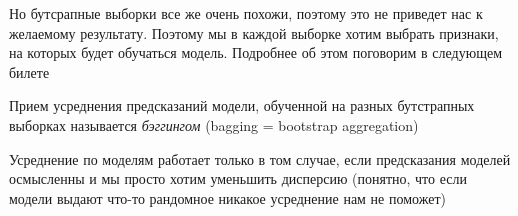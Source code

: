 Но бутсрапные выборки все же очень похожи, поэтому это не приведет нас к желаемому результату. Поэтому мы в каждой выборке хотим выбрать признаки, на которых будет обучаться модель. Подробнее об этом поговорим в следующем билете

\begin{definition}
    Прием усреднения предсказаний модели, обученной на разных бутстрапных выборках называется \textit{бэггингом} (bagging = bootstrap aggregation)
\end{definition}

\begin{lemmanote}
    Усреднение по моделям работает только в том случае, если предсказания моделей осмысленны и мы просто хотим уменьшить дисперсию (понятно, что если модели выдают что-то рандомное никакое усреднение нам не поможет)
\end{lemmanote}